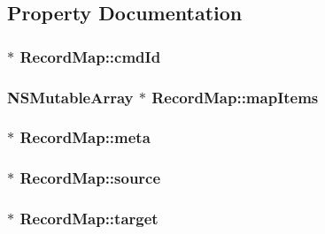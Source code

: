 \subsection{\-Property \-Documentation}
\hypertarget{interface_record_map_abf0c3203e8c28ecf7da0c83a450802be}{
\subsubsection[{cmd\-Id}]{ $\ast$ \-Record\-Map\-::cmd\-Id}}
\label{interface_record_map_abf0c3203e8c28ecf7da0c83a450802be}
\hypertarget{interface_record_map_a7aec30cb32e7c3e45035985af1cd5c1f}{
\subsubsection[{map\-Items}]{\setlength{\rightskip}{0pt plus 5cm}\-N\-S\-Mutable\-Array $\ast$ \-Record\-Map\-::map\-Items}}
\label{interface_record_map_a7aec30cb32e7c3e45035985af1cd5c1f}
\hypertarget{interface_record_map_adc8a627547989263dce8bf0bb05fd0a1}{
\subsubsection[{meta}]{ $\ast$ \-Record\-Map\-::meta}}
\label{interface_record_map_adc8a627547989263dce8bf0bb05fd0a1}
\hypertarget{interface_record_map_adc1c74facf55d83e06bd887e2d54b5d9}{
\subsubsection[{source}]{ $\ast$ \-Record\-Map\-::source}}
\label{interface_record_map_adc1c74facf55d83e06bd887e2d54b5d9}
\hypertarget{interface_record_map_a723f2d30d0ef569ace1dde005036f577}{
\subsubsection[{target}]{ $\ast$ \-Record\-Map\-::target}}
\label{interface_record_map_a723f2d30d0ef569ace1dde005036f577}


